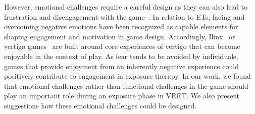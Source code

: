 However, emotional challenges require a careful design as they can also lead to frustration and disengagement with the game~\cite{gowler2019}. In relation to \acp{ET}, facing and overcoming negative emotions have been recognized as capable elements for shaping engagement and motivation in game design. Accordingly,  Ilinx~\cite{bateman2006,caillois1961} or vertigo games~\cite{byrne2016, byrne2016b} are built around core experiences of vertigo that can become enjoyable in the context of play. As fear tends to be avoided by individuals, games that provide enjoyment from an inherently negative experience could positively contribute to engagement in exposure therapy. 
In our work, we found that emotional challenges rather than functional challenges in the game should play an important role during an exposure phase in \ac{VRET}. We also present suggestions how these emotional challenges could be designed.







